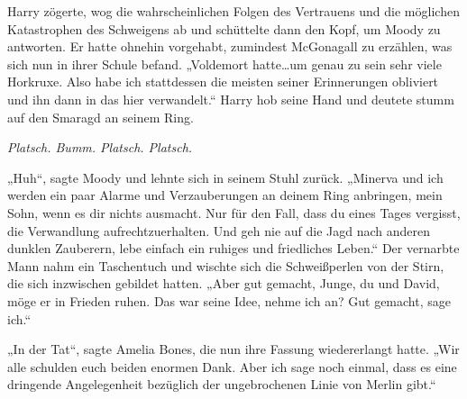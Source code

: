 Harry zögerte, wog die wahrscheinlichen Folgen des Vertrauens und die möglichen Katastrophen des Schweigens ab und schüttelte dann den Kopf, um Moody zu antworten. Er hatte ohnehin vorgehabt, zumindest McGonagall zu erzählen, was sich nun in ihrer Schule befand.
„Voldemort hatte…um genau zu sein sehr viele Horkruxe. Also habe ich stattdessen die meisten seiner Erinnerungen obliviert und ihn dann in das hier verwandelt.“
Harry hob seine Hand und deutete stumm auf den Smaragd an seinem Ring.

\emph{Platsch. Bumm. Platsch. Platsch.}

„Huh“, sagte Moody und lehnte sich in seinem Stuhl zurück. „Minerva und ich werden ein paar Alarme und Verzauberungen an deinem Ring anbringen, mein Sohn, wenn es dir nichts ausmacht. Nur für den Fall, dass du eines Tages vergisst, die Verwandlung aufrechtzuerhalten. Und geh nie auf die Jagd nach anderen dunklen Zauberern, lebe einfach ein ruhiges und friedliches Leben.“
Der vernarbte Mann nahm ein Taschentuch und wischte sich die Schweißperlen von der Stirn, die sich inzwischen gebildet hatten.
„Aber gut gemacht, Junge, du und David, möge er in Frieden ruhen. Das war seine Idee, nehme ich an? Gut gemacht, sage ich.“

„In der Tat“, sagte Amelia Bones, die nun ihre Fassung wiedererlangt hatte.
„Wir alle schulden euch beiden enormen Dank. Aber ich sage noch einmal, dass es eine dringende Angelegenheit bezüglich der ungebrochenen Linie von Merlin gibt.“

